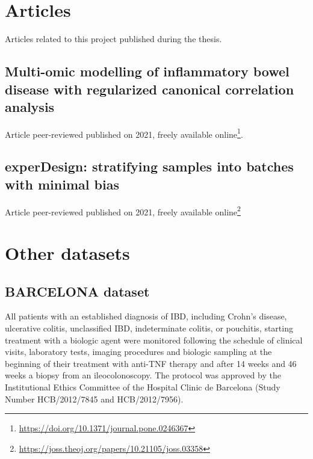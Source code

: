 \documentclass[
  a4paper,
]{book}
\DeclareRobustCommand{\href}[2]{#2\footnote{\url{#1}}}
\begin{document}
\hypertarget{articles}{%
\chapter{Articles}\label{articles}}

Articles related to this project published during the thesis.

\hypertarget{app-multiomics}{%
\section{Multi-omic modelling of inflammatory bowel disease with regularized canonical correlation analysis}\label{app-multiomics}}


Article peer-reviewed published on 2021, freely \href{https://doi.org/10.1371/journal.pone.0246367}{available online}.



\hypertarget{app-experDesign}{%
\section{experDesign: stratifying samples into batches with minimal bias}\label{app-experDesign}}


Article peer-reviewed published on 2021, freely \href{https://joss.theoj.org/papers/10.21105/joss.03358}{available online}



\hypertarget{other-datasets}{%
\chapter{Other datasets}\label{other-datasets}}

\hypertarget{barcelona}{%
\section{BARCELONA dataset}\label{barcelona}}

All patients with an established diagnosis of IBD, including Crohn's disease, ulcerative colitis, unclassified IBD, indeterminate colitis, or pouchitis, starting treatment with a biologic agent were monitored following the schedule of clinical visits, laboratory tests, imaging procedures and biologic sampling at the beginning of their treatment with anti-TNF therapy and after 14 weeks and 46 weeks a biopsy from an ileocolonoscopy.
The protocol was approved by the Institutional Ethics Committee of the Hospital Clinic de Barcelona (Study Number HCB/2012/7845 and HCB/2012/7956).
\end{document}
